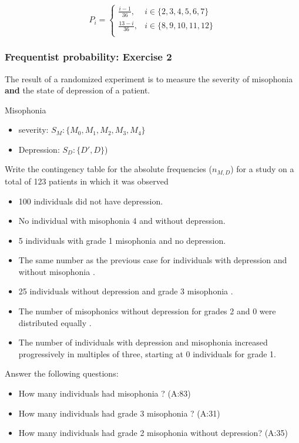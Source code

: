 \documentclass[
]{book}
\providecommand{\tightlist}{%
  \setlength{\itemsep}{0pt}\setlength{\parskip}{0pt}}
\begin{document}
\[
P_i=
\begin{cases}
\frac{i-1}{36},& i \in \{2,3,4,5,6, 7\} \\
\frac{13-i}{36},& i \in \{8,9,10,11,12\} \\
\end{cases}
\]

\hypertarget{frequentist-probability-exercise-2}{%
\subsubsection{Frequentist probability: Exercise 2}\label{frequentist-probability-exercise-2}}

The result of a randomized experiment is to measure the severity of misophonia \textbf{and} the state of depression of a patient.

Misophonia

\begin{itemize}
\tightlist
\item
  severity: \(S_M:\{M_ 0,M _1,M_2,M_3,M_4\}\)
\item
  Depression: \(S_ D:\{ D', D\}\))
\end{itemize}

Write the contingency table for the absolute frequencies (\(n_{ M,D }\)) for a study on a total of 123 patients in which it was observed

\begin{itemize}
\tightlist
\item
  100 individuals did not have depression.
\item
  No individual with misophonia 4 and without depression.
\item
  5 individuals with grade 1 misophonia and no depression.
\item
  The same number as the previous case for individuals with depression and without misophonia .
\item
  25 individuals without depression and grade 3 misophonia .
\item
  The number of misophonics without depression for grades 2 and 0 were distributed equally .
\item
  The number of individuals with depression and misophonia increased progressively
  in multiples of three, starting at 0 individuals for grade 1.
\end{itemize}

Answer the following questions:

\begin{itemize}
\tightlist
\item
  How many individuals had misophonia ? (A:83)
\item
  How many individuals had grade 3 misophonia ? (A:31)
\item
  How many individuals had grade 2 misophonia without depression? (A:35)
\end{itemize}
\end{document}
